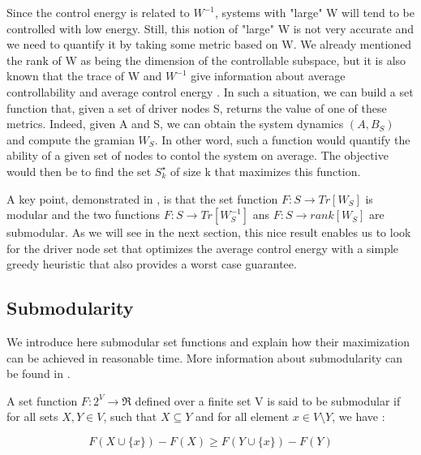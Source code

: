 \documentclass[conference]{IEEEtran}
\begin{document}
Since the control energy is related to $ W^{-1} $, systems with "large" W will tend to be controlled with low energy. Still, this notion of "large" W is not very accurate and we need to quantify it by taking some metric based on W. We already mentioned the rank of W as being the dimension of the controllable subspace, but it is also known that the trace of W and $W^{-1}$ give information about average controllability and average control energy \cite{Summers2014}. In such a situation, we can build a set function that, given a set of driver nodes S, returns the value of one of these metrics. Indeed, given A and S, we can obtain the system dynamics $(A,B_S)$ and compute the gramian $W_S$. In other word, such a function would quantify the ability of a given set of nodes to contol the system on average. The objective would then be to find the set $S_k^{\star}$ of size k that maximizes this function.

A key point, demonstrated in \cite{Summers2014}, is that the set function $ F:S \longrightarrow Tr[W_S] $ is modular and the two functions $F:S \longrightarrow Tr[W^{-1}_S] $ ans $ F:S \longrightarrow rank[W_S] $ are submodular. As we will see in the next section, this nice result enables us to look for the driver node set that optimizes the average control energy with a simple greedy heuristic that also provides a worst case guarantee.

\subsection{Submodularity}

We introduce here submodular set functions and explain how their maximization can be achieved in reasonable time. More information about submodularity can be found in \cite{Krause2014}.

A set function $ F:2^{V} \longrightarrow \Re $ defined over a finite set V is said to be submodular if for all sets $ X, Y \in V$, such that $ X \subseteq Y$ and for all element $ x \in V \setminus Y$, we have :

\begin{equation}
F(X \cup \{ x \} ) - F(X) \geq F(Y \cup \{ x \} ) - F(Y)
\end{equation} 


\end{document}
